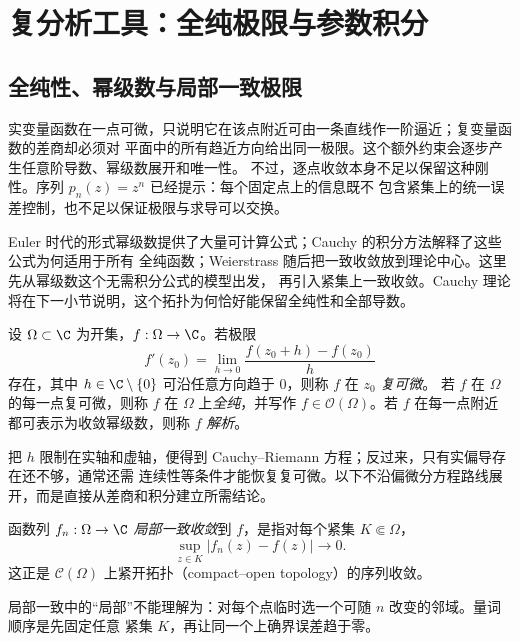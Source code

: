 \section{复分析工具：全纯极限与参数积分}\label{sec:07-01}

\subsection{全纯性、幂级数与局部一致极限}\label{subsec:7-1-1}

实变量函数在一点可微，只说明它在该点附近可由一条直线作一阶逼近；复变量函数的差商却必须对
平面中的所有趋近方向给出同一极限。这个额外约束会逐步产生任意阶导数、幂级数展开和唯一性。
不过，逐点收敛本身不足以保留这种刚性。序列 $p_n(z)=z^n$ 已经提示：每个固定点上的信息既不
包含紧集上的统一误差控制，也不足以保证极限与求导可以交换。

Euler 时代的形式幂级数提供了大量可计算公式；Cauchy 的积分方法解释了这些公式为何适用于所有
全纯函数；Weierstrass 随后把一致收敛放到理论中心。这里先从幂级数这个无需积分公式的模型出发，
再引入紧集上一致收敛。Cauchy 理论将在下一小节说明，这个拓扑为何恰好能保留全纯性和全部导数。

\begin{definition}[复可微与全纯]\label{def:7-1-1-1}
设 $\Omega\subset\C$ 为开集，$f:\Omega\to\C$。若极限
\[
  f'(z_0)=\lim_{h\to0}\frac{f(z_0+h)-f(z_0)}{h}
\]
存在，其中 $h\in\C\setminus\{0\}$ 可沿任意方向趋于 $0$，则称 $f$ 在 $z_0$ \emph{复可微}。
若 $f$ 在 $\Omega$ 的每一点复可微，则称 $f$ 在 $\Omega$ 上\emph{全纯}，并写作
$f\in\mathcal O(\Omega)$。若 $f$ 在每一点附近都可表示为收敛幂级数，则称 $f$ \emph{解析}。
\end{definition}

把 $h$ 限制在实轴和虚轴，便得到 Cauchy--Riemann 方程；反过来，只有实偏导存在还不够，通常还需
连续性等条件才能恢复复可微。以下不沿偏微分方程路线展开，而是直接从差商和积分建立所需结论。

\begin{definition}[局部一致收敛]\label{def:7-1-1-2}
函数列 $f_n:\Omega\to\C$ \emph{局部一致收敛}到 $f$，是指对每个紧集
$K\Subset\Omega$，
\[
  \sup_{z\in K}|f_n(z)-f(z)|\longrightarrow0.
\]
这正是 $\mathcal C(\Omega)$ 上紧开拓扑（compact--open topology）的序列收敛。
\end{definition}

局部一致中的“局部”不能理解为：对每个点临时选一个可随 $n$ 改变的邻域。量词顺序是先固定任意
紧集 $K$，再让同一个上确界误差趋于零。

